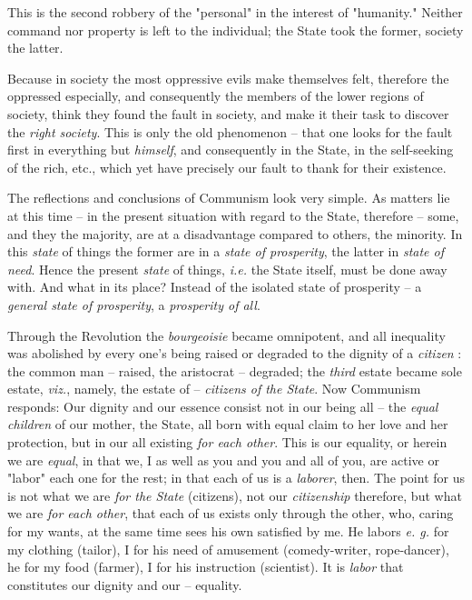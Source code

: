 \documentclass[a4paper]{book}
\begin{document}
This is the second robbery of the "{}personal"{} in the interest of 
"{}humanity."{} Neither command nor property is left to the individual; the 
State took the former, society the latter.

Because in society the most oppressive evils make themselves felt, therefore 
the oppressed especially, and consequently the members of the lower regions of 
society, think they found the fault in society, and make it their task to 
discover the \textit{right society}. This is only the old phenomenon -- that 
one looks for the fault first in everything but \textit{himself}, and 
consequently in the State, in the self-seeking of the rich, etc., which yet 
have precisely our fault to thank for their existence.

 The reflections and conclusions of Communism look very simple. As matters lie 
at this time -- in the present situation with regard to the State, therefore 
-- some, and they the majority, are at a disadvantage compared to others, the 
minority. In this \textit{state} of things the former are in a \textit{state 
of prosperity}, the latter in \textit{state of need}. Hence the present 
\textit{state} of things, \textit{i.e.} the State itself, must be done away 
with. And what in its place? Instead of the isolated state of prosperity -- a 
\textit{general state of prosperity}, a \textit{prosperity of all}.

Through the Revolution the \textit{bourgeoisie} became omnipotent, and all 
inequality was abolished by every one's being raised or degraded to the 
dignity of a \textit{citizen} : the common man -- raised, the aristocrat -- 
degraded; the \textit{third} estate became sole estate, \textit{viz.}, namely, 
the estate of -- \textit{citizens of the State}. Now Communism responds: Our 
dignity and our essence consist not in our being all -- the \textit{equal 
children} of our mother, the State, all born with equal claim to her love and 
her protection, but in our all existing \textit{for each other}. This is our 
equality, or herein we are \textit{equal}, in that we, I as well as you and 
you and all of you, are active or "{}labor"{} each one for the rest; in that 
each of us is a \textit{laborer}, then. The point for us is not what we are 
\textit{for the State} (citizens), not our \textit{citizenship} therefore, but 
what we are \textit{for each other}, that each of us exists only through the 
other, who, caring for my wants, at the same time sees his own satisfied by 
me. He labors \textit{e. g.} for my clothing (tailor), I for his need of 
amusement (comedy-writer, rope-dancer), he for my food (farmer), I for his 
instruction (scientist). It is \textit{labor} that constitutes our dignity and 
our -- equality.
\end{document}
